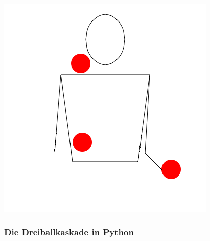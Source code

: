 \includegraphics{img/3-ball_cascade_movie.png}


\subsubsection{\texorpdfstring{{Die Dreiballkaskade in
Python}}{Die Dreiballkaskade in Python}}

